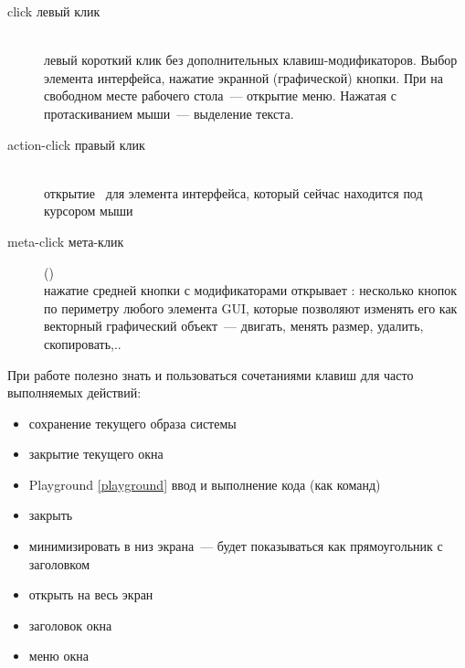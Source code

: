 
\begin{description}
    \item[click левый клик \keys{\lms}]\ \\
    левый короткий клик без дополнительных клавиш-модификаторов. Выбор элемента интерфейса,
    нажатие экранной (графической) кнопки. При \keys{\lms} на свободном месте рабочего стола\ --- открытие  меню.
    Нажатая \keys{\lms} с протаскиванием мыши\ --- выделение текста.
    \item[action-click правый клик \keys{\rms}]\ \\
    открытие \ для элемента интерфейса, который сейчас находится под курсором мыши
    \clearpage{}
    \item[meta-click мета-клик ] (\linux)\ \\
    нажатие средней кнопки с модификаторами открывает : несколько кнопок по периметру любого элемента GUI,
    которые позволяют изменять его как векторный графический объект\ --- двигать, менять размер, удалить, скопировать,..
\end{description}


При работе полезно знать и пользоваться сочетаниями клавиш для часто выполняемых действий:

\begin{itemize}
    \item {} сохранение текущего образа системы
    \item {} закрытие текущего окна
    \item {} Playground \ref{playground} ввод и выполнение кода (как команд)
\end{itemize}

\clearpage
{}


\begin{itemize}
    \item закрыть
    \item минимизировать в низ экрана\ --- будет показываться как прямоугольник с заголовком
    \item открыть на весь экран
    \item заголовок окна
    \item меню окна
\end{itemize}

\secup
